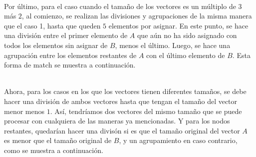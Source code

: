 \documentclass[conference]{IEEEtran}
\begin{document}
\verb| |\\
Por último, para el caso cuando el tamaño de los vectores es un múltiplo de $3$ más $2$, al comienzo, se realizan las divisiones y agrupaciones de la misma manera que el caso 1, hasta que queden $5$ elementos por asignar. En este punto, se hace una división entre el primer elemento de $A$ que aún no ha sido asignado con todos los elementos sin asignar de $B$, menos el último. Luego, se hace una agrupación entre los elementos restantes de $A$ con el último elemento de $B$. Esta forma de match se muestra a continuación.\\
\begin{center}
\end{center}
\verb||\\
Ahora, para los casos en los que los vectores tienen diferentes tamaños, se debe hacer una división de ambos vectores hasta que tengan el tamaño del vector menor menos $1$. Así, tendríamos dos vectores del mismo tamaño que se puede procesar con cualquiera de las maneras ya mencionadas. Y para los nodos restantes, quedarían hacer una divisón si es que el tamaño original del vector $A$ es menor que el tamaño original de $B$, y un agrupamiento en caso contrario, como se muestra a continuación.\\
\end{document}

